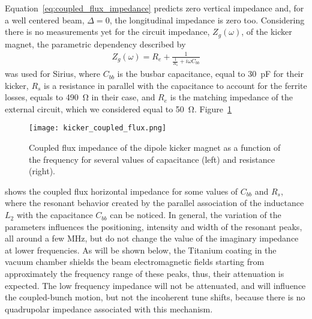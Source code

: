     Equation~\eqref{eq:coupled_flux_impedance} predicts zero vertical impedance and, for a well centered beam, $\Delta=0$, the longitudinal impedance is zero too. Considering there is no measurements yet for the circuit impedance, $Z_g(\omega)$, of the kicker magnet, the parametric dependency described by~
    \begin{align}
        Z_g(\omega) = R_e + \frac{1}{\frac{1}{R_s}+i\omega C_{bb}}
    \end{align}
    was used for Sirius, where $C_{bb}$ is the busbar capacitance, equal to \SI{30}{\pico\farad} for their kicker, $R_s$ is a resistance in parallel with the capacitance to account for the ferrite losses, equals to \SI{490}{\ohm} in their case, and $R_e$ is the matching impedance of the external circuit, which we considered equal to \SI{50}{\ohm}. Figure~\ref{fig:coupled_flux_impedance}
    \begin{figure}
        \centering
        \texttt{[image: kicker\_coupled\_flux.png]}
        \caption[Coupled flux impedance of the dipole kicker magnet.]{Coupled flux impedance of the dipole kicker magnet as a function of the frequency for several values of capacitance (left) and resistance (right).}
        \label{fig:coupled_flux_impedance}
    \end{figure}
    shows the coupled flux horizontal impedance for some values of $C_{bb}$ and $R_s$, where the resonant behavior created by the parallel association of the inductance $L_2$ with the capacitance $C_{bb}$ can be noticed. In general, the variation of the parameters influences the positioning, intensity and width of the resonant peaks, all around a few \si{\mega\hertz}, but do not change the value of the imaginary impedance at lower frequencies. As will be shown below, the Titanium coating in the vacuum chamber shields the beam electromagnetic fields starting from approximately the frequency range of these peaks, thus, their attenuation is expected. The low frequency impedance will not be attenuated, and will influence the coupled-bunch motion, but not the incoherent tune shifts, because there is no quadrupolar impedance associated with this mechanism.

